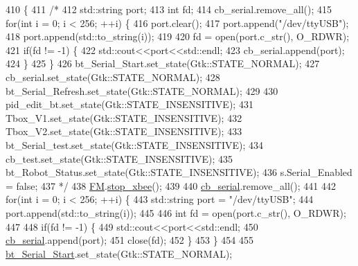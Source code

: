 \begin{DoxyCode}
410                                   \{
411 \textcolor{comment}{/*}
412 \textcolor{comment}{    std::string port;}
413 \textcolor{comment}{    int fd;}
414 \textcolor{comment}{    cb\_serial.remove\_all();}
415 \textcolor{comment}{    for(int i = 0; i < 256; ++i) \{}
416 \textcolor{comment}{        port.clear();}
417 \textcolor{comment}{        port.append("/dev/ttyUSB");}
418 \textcolor{comment}{        port.append(std::to\_string(i));}
419 \textcolor{comment}{}
420 \textcolor{comment}{        fd = open(port.c\_str(), O\_RDWR);}
421 \textcolor{comment}{        if(fd != -1) \{}
422 \textcolor{comment}{            std::cout<<port<<std::endl;}
423 \textcolor{comment}{            cb\_serial.append(port);}
424 \textcolor{comment}{        \}}
425 \textcolor{comment}{    \}}
426 \textcolor{comment}{    bt\_Serial\_Start.set\_state(Gtk::STATE\_NORMAL);}
427 \textcolor{comment}{    cb\_serial.set\_state(Gtk::STATE\_NORMAL);}
428 \textcolor{comment}{    bt\_Serial\_Refresh.set\_state(Gtk::STATE\_NORMAL);}
429 \textcolor{comment}{}
430 \textcolor{comment}{    pid\_edit\_bt.set\_state(Gtk::STATE\_INSENSITIVE);}
431 \textcolor{comment}{    Tbox\_V1.set\_state(Gtk::STATE\_INSENSITIVE);}
432 \textcolor{comment}{    Tbox\_V2.set\_state(Gtk::STATE\_INSENSITIVE);}
433 \textcolor{comment}{    bt\_Serial\_test.set\_state(Gtk::STATE\_INSENSITIVE);}
434 \textcolor{comment}{    cb\_test.set\_state(Gtk::STATE\_INSENSITIVE);}
435 \textcolor{comment}{    bt\_Robot\_Status.set\_state(Gtk::STATE\_INSENSITIVE);}
436 \textcolor{comment}{    s.Serial\_Enabled = false;}
437 \textcolor{comment}{*/}
438     \hyperlink{class_control_g_u_i_a16612b604257a888faac7a1d7e9e3e51}{FM}.\hyperlink{class_flying_messenger_ab9ed5a0b43196b5771a469c03f213856}{stop\_xbee}();
439 
440     \hyperlink{class_control_g_u_i_a730f792c7de4d8c3cd4c933876d8bc52}{cb\_serial}.remove\_all();
441 
442     \textcolor{keywordflow}{for}(\textcolor{keywordtype}{int} i = 0; i < 256; ++i) \{
443         std::string port = \textcolor{stringliteral}{"/dev/ttyUSB"};
444         port.append(std::to\_string(i));
445 
446         \textcolor{keywordtype}{int} fd = open(port.c\_str(), O\_RDWR);
447 
448         \textcolor{keywordflow}{if}(fd != -1) \{
449             std::cout<<port<<std::endl;
450             \hyperlink{class_control_g_u_i_a730f792c7de4d8c3cd4c933876d8bc52}{cb\_serial}.append(port);
451             close(fd);
452         \}
453     \}
454 
455     \hyperlink{class_control_g_u_i_ae4c22e835b13a173a02ef4514b28c7f1}{bt\_Serial\_Start}.set\_state(Gtk::STATE\_NORMAL);

\end{DoxyCode}
